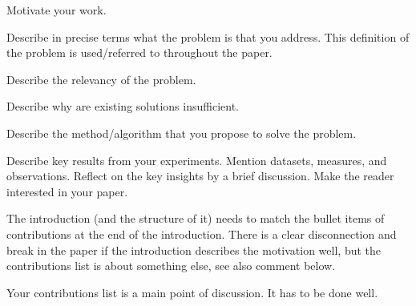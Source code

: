\documentclass[sigconf, review, nonacm]{acmart}
\begin{document}



Motivate your work.



Describe in precise terms what the problem is that you address. 
This definition of the problem is used/referred to throughout the paper.


Describe the relevancy of the problem. 


Describe why are existing solutions insufficient.



Describe the method/algorithm that you propose to solve the problem.


Describe key results from your experiments. 
Mention datasets, measures, and observations.
Reflect on the key insights by a brief discussion.
Make the reader interested in your paper.


\begin{tcolorbox}[title=Instruction: Write down your list of contributions.]
The introduction (and the structure of it) needs to match the bullet items of contributions at the end of the introduction. There is a clear disconnection and break in the paper if the introduction describes the motivation well, but the contributions list is about something else, see also comment below. 

Your contributions list is a main point of discussion. 
It has to be done well. 
\end{tcolorbox}
\end{document}
